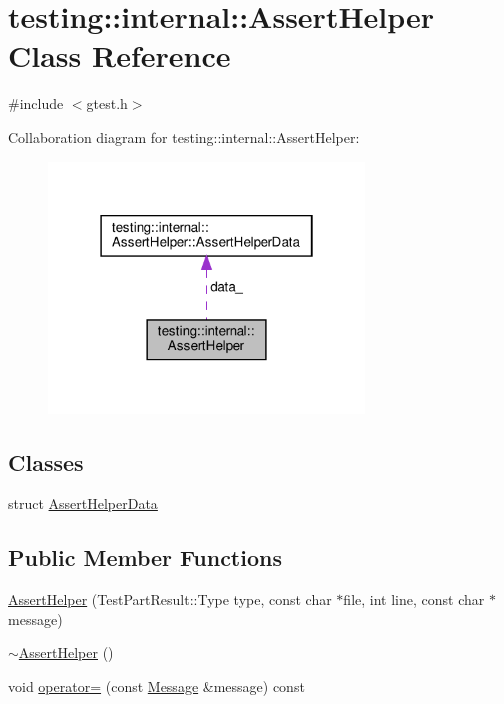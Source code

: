 \hypertarget{classtesting_1_1internal_1_1AssertHelper}{}\section{testing\+:\+:internal\+:\+:Assert\+Helper Class Reference}
\label{classtesting_1_1internal_1_1AssertHelper}


{\ttfamily \#include $<$gtest.\+h$>$}



Collaboration diagram for testing\+:\+:internal\+:\+:Assert\+Helper\+:\nopagebreak
\begin{figure}[H]
\begin{center}
\leavevmode
\includegraphics[width=238pt]{classtesting_1_1internal_1_1AssertHelper__coll__graph}
\end{center}
\end{figure}
\subsection*{Classes}
\begin{DoxyCompactItemize}
\item 
struct \hyperlink{structtesting_1_1internal_1_1AssertHelper_1_1AssertHelperData}{Assert\+Helper\+Data}
\end{DoxyCompactItemize}
\subsection*{Public Member Functions}
\begin{DoxyCompactItemize}
\item 
\hyperlink{classtesting_1_1internal_1_1AssertHelper_ac2c9334518fd4087189b4505567a3c90}{Assert\+Helper} (Test\+Part\+Result\+::\+Type type, const char $\ast$file, int line, const char $\ast$message)
\item 
\hyperlink{classtesting_1_1internal_1_1AssertHelper_a51c640785d4ed4a0155cc9aa857d8931}{$\sim$\+Assert\+Helper} ()
\item 
void \hyperlink{classtesting_1_1internal_1_1AssertHelper_a97bf22d786131ab7baa86b97a27aeb4d}{operator=} (const \hyperlink{classtesting_1_1Message}{Message} \&message) const
\end{DoxyCompactItemize}
